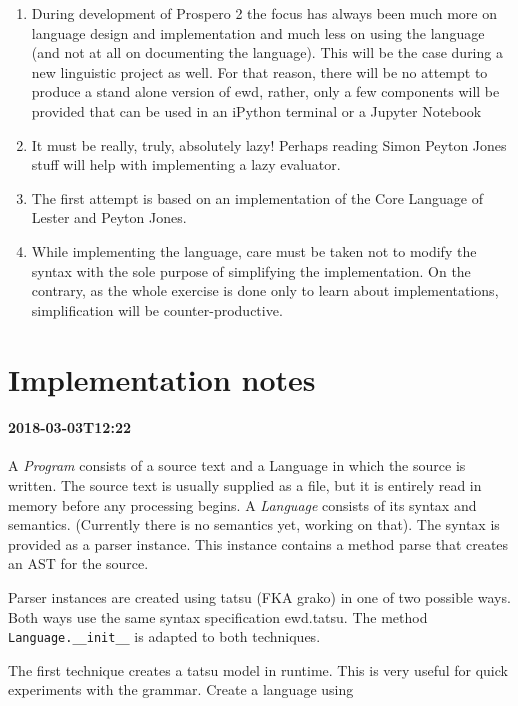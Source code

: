 \documentclass[11pt, a4paper]{article}
\begin{document}
\begin{enumerate}
\item During development of Prospero 2 the focus has always been much more on language 
design and implementation and much less on using the language (and not at all on 
documenting the language). 
This will be the case during a new linguistic project as well. 
For that reason, there will be no attempt to produce a stand alone version of ewd, rather, only a few components will be provided that can be used in an iPython terminal or a Jupyter Notebook

\item It must be really, truly, absolutely lazy! Perhaps reading Simon Peyton Jones 
stuff will help with implementing a lazy evaluator.

\item The first attempt is based on an implementation of the Core Language of Lester and Peyton Jones.

\item While implementing the language, care must be taken not to modify the syntax with the sole purpose of simplifying the implementation.
On the contrary, as the whole exercise is done only to learn about implementations, simplification will be counter-productive.

\end{enumerate}

\section{Implementation notes}

\paragraph{2018-03-03T12:22}

A \emph{Program} consists of a source text and a Language in which the source is written. 
The source text is usually supplied as a file, but it is entirely read in memory before any processing begins.
A \emph{Language} consists of its syntax and semantics. (Currently there is no semantics yet, working on that). 
The syntax is provided as a parser instance.
This instance contains a method parse that creates an AST for the source.

Parser instances are created using tatsu (FKA grako) in one of two possible ways. 
Both ways use the same syntax specification ewd.tatsu. 
The method \verb|Language.__init__| is adapted to both techniques.

The first technique creates a tatsu model in runtime. 
This is very useful for quick experiments with the grammar. 
Create a language using
\end{document}

